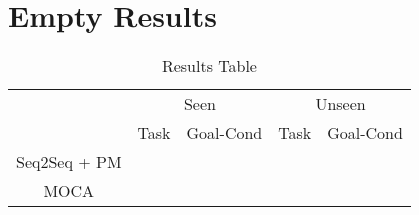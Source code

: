 \documentclass[11pt,a4paper]{article}
\begin{document}
\section{Empty Results}

\begin{table*}[]
    \centering
    \begin{tabular}{c|c|c|c|c}
    \toprule
    & \multicolumn{2}{c|}{Seen} & \multicolumn{2}{c}{Unseen} \\
    & Task & Goal-Cond & Task & Goal-Cond \\
    \midrule
    Seq2Seq + PM & & & & \\
    MOCA & & & & \\
    \bottomrule
    \end{tabular}
    \caption{Results Table}
    \label{tab:my_label}
\end{table*}

\clearpage



\end{document}

